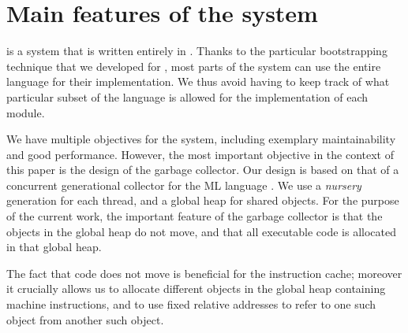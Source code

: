 \section{Main features of the \sicl{} system}
\label{sec-sicl-features}

\sicl{} is a system that is written entirely in \commonlisp{}.  Thanks
to the particular bootstrapping technique
\cite{durand_irene_2019_2634314} that we developed for \sicl{}, most
parts of the system can use the entire language for their
implementation.  We thus avoid having to keep track of what particular
subset of the language is allowed for the implementation of each
module.

We have multiple objectives for the \sicl{} system, including
exemplary maintainability and good performance.  However, the most
important objective in the context of this paper is the design of the
garbage collector.  Our design is based on that of a concurrent
generational collector for the ML language \cite{Doligez:1993:CGG}.
We use a \emph{nursery} generation for each thread, and a global heap
for shared objects.  For the purpose of the current work, the
important feature of the garbage collector is that the objects in the
global heap do not move, and that all executable code is allocated in
that global heap.

The fact that code does not move is beneficial for the instruction
cache; moreover it crucially allows us to allocate different objects
in the global heap containing machine instructions, and to use fixed
relative addresses to refer to one such object from another such
object.
